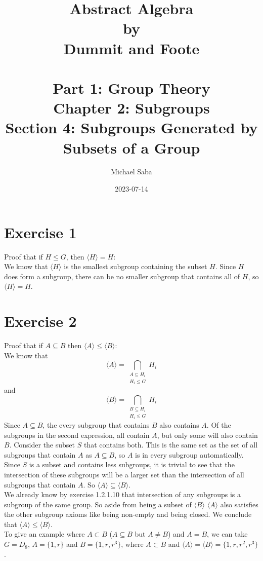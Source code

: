 \documentclass[12pt]{article}
\title{%
    \Huge Abstract Algebra \\
    \large by \\
    \Large Dummit and Foote \\~\\
    \huge Part 1: Group Theory \\
    \LARGE Chapter 2: Subgroups \\
    \Large Section 4: Subgroups Generated by Subsets of a Group
}
\date{2023-07-14}
\author{Michael Saba}
\newcommand{\seq}{\leqslant}
\newcommand{\sub}{\subseteq}
\newcommand{\prosub}{\subset}
\begin{document}
    \maketitle
    \newpage


    \section*{Exercise 1}
    Proof that if $H \seq G$, then $\langle H \rangle = H$: \\
    We know that $\langle H \rangle$ is the smallest subgroup
    containing the subset $H$.
    Since $H$ does form a subgroup, there can be no smaller
    subgroup that contains all of $H$, so $\langle H \rangle = H$.

    
    \section*{Exercise 2}
    Proof that if $A \sub B$
    then $\langle A \rangle \seq \langle B \rangle$: \\
    We know that
    \[ \langle A \rangle
    = \bigcap_{\substack{A \sub H_i \\ H_i \seq G}} H_i \]
    and
    \[ \langle B \rangle
    = \bigcap_{\substack{B \sub H_i \\ H_i \seq G}} H_i \]
    Since $A \sub B$,
    the every subgroup that contains $B$ also contains $A$.
    Of the subgroups in the second expression,
    all contain $A$, but only some will also contain $B$.
    Consider the subset $S$ that contains both.
    This is the same set as the set of all subgroups that contain
    $A$ as $A \sub B$,
    so $A$ is in every subgroup automatically.
    Since $S$ is a subset and contains less subgroups,
    it is trivial to see that the intersection of these subgroups
    will be a larger set than the intersection of all subgroups
    that contain $A$.
    So $\langle A \rangle \sub \langle B \rangle$. \\
    We already know by exercise 1.2.1.10 that intersection
    of any subgroups is a subgroup of the same group.
    So aside from being a subset of $\langle B \rangle$
    $\langle A \rangle$ also satisfies the other
    subgroup axioms like being non-empty and being closed.
    We conclude that $\langle A \rangle \seq \langle B \rangle$. \\
    To give an example where $A \prosub B$
    ($A \sub B$ but $A \neq B$) and $A = B$,
    we can take $G = D_8$, $A = \{1, r\}$ and $B = \{1, r, r^3\}$,
    where $A \prosub B$
    and $\langle A \rangle = \langle B \rangle = \{1, r, r^2, r^3\}$.
\end{document}
